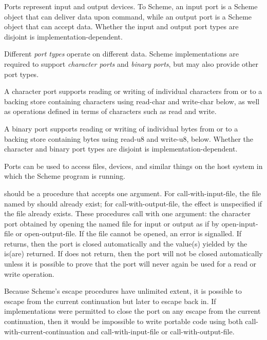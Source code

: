 Ports represent input and output devices.  To Scheme, an input port is
a Scheme object that can deliver data upon command, while an output
port is a Scheme object that can accept data.
Whether the input and output port types are disjoint is
implementation-dependent.

Different {\em port types} operate on different data.  Scheme
imple\-men\-ta\-tions are required to support {\em character ports}
and {\em binary ports}, but may also provide other port types.

A character port supports reading or writing of individual characters
from or to a backing store containing characters
using {\cf read-char} and {\cf write-char} below, as well as operations
defined in terms of characters such as {\cf read} and {\cf write}.

A binary port supports reading or writing of individual bytes from
or to a backing store containing bytes using {\cf read-u8} and {\cf
write-u8}, below.
Whether the character and binary port types are disjoint is
implementation-dependent.

Ports can be used to access files, devices, and similar things on the host
system in which the Scheme program is running.

\begin{entry}{%
}

 should be a procedure that accepts one argument.
For {\cf call-with-input-file},
the file named by  should already exist; for
{\cf call-with-output-file},
the effect is unspecified if the file
already exists. These procedures call  with one argument: the
character port obtained by opening the named file for input or output
as if by {\cf open-input-file} or {\cf open-output-file}.  If the
file cannot be opened, an error is signalled.  If  returns,
then the port is closed automatically and the value(s) yielded by the
 is(are) returned.  If  does not return, then 
the port will not be closed automatically unless it is possible to
prove that the port will never again be used for a read or write
operation.

\begin{rationale}
Because Scheme's escape procedures have unlimited extent, it  is
possible to escape from the current continuation but later to escape back in. 
If implementations were permitted to close the port on any escape from the
current continuation, then it would be impossible to write portable code using
both {\cf call-with-current-continuation} and {\cf call-with-input-file} or
{\cf call-with-output-file}.
\end{rationale} 
\end{entry}

